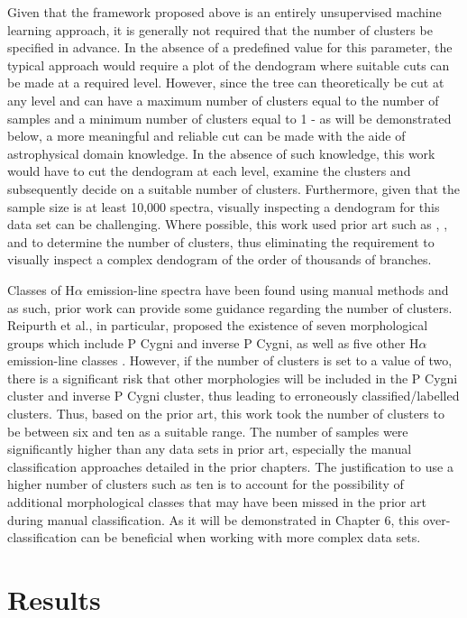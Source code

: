 Given that the framework proposed above is an entirely unsupervised machine learning approach, it is generally not required that the number of clusters be specified in advance. In the absence of a predefined value for this parameter, the typical approach would require a plot of the dendogram where suitable cuts can be made at a required level. However, since the tree can theoretically be cut at any level and can have a maximum number of clusters equal to the number of samples and a minimum number of clusters equal to 1 - as will be demonstrated below, a more meaningful and reliable cut can be made with the aide of astrophysical domain knowledge. In the absence of such knowledge, this work would have to cut the dendogram at each level, examine the clusters and subsequently decide on a suitable number of clusters. Furthermore, given that the sample size is at least 10,000 spectra, visually inspecting a dendogram for this data set can be challenging. Where possible, this work used prior art such as \citet{reipurth1996halpha}, \citet{traven2017galah}, and \citet{zhang2021catalog} to determine the number of clusters, thus eliminating the requirement to visually inspect a complex dendogram of the order of thousands of branches. 

Classes of H$\alpha$ emission-line spectra have been found using manual methods and as such, prior work can provide some guidance regarding the number of clusters. Reipurth et al., in particular, proposed the existence of seven morphological groups which include P Cygni and inverse P Cygni, as well as five other H$\alpha$ emission-line classes \citep{reipurth1996halpha}. However, if the number of clusters is set to a value of two, there is a significant risk that other morphologies will be included in the P Cygni cluster and inverse P Cygni cluster, thus leading to erroneously classified/labelled clusters. Thus, based on the prior art, this work took the number of clusters to be between six and ten as a suitable range. The number of samples were significantly higher than any data sets in prior art, especially the manual classification approaches detailed in the prior chapters. The justification to use a higher number of clusters such as ten is to account for the possibility of additional morphological classes that may have been missed in the prior art during manual classification. As it will be demonstrated in Chapter 6, this over-classification can be beneficial when working with more complex data sets.

\section{Results}

